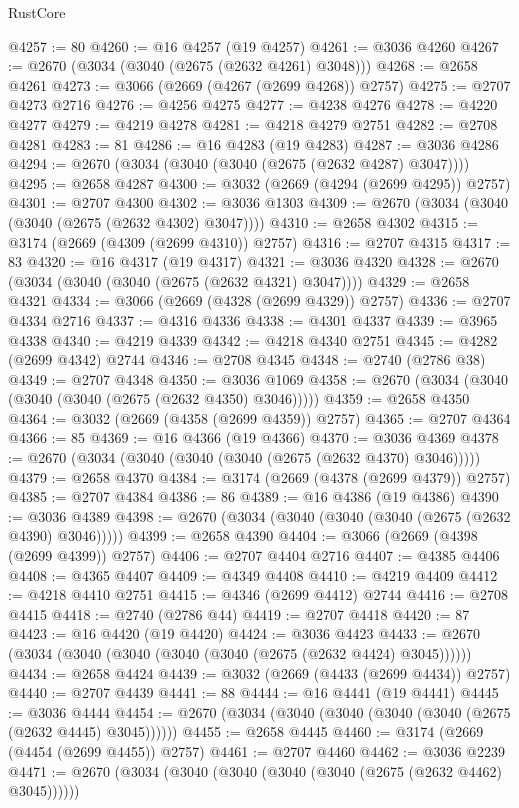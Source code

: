 \begin{lexlean}{RustCore}
\begin{coremodule}
@4257 := 80
@4260 := @16 @4257 (@19 @4257)
@4261 := @3036 @4260
@4267 := @2670 (@3034 (@3040 (@2675 (@2632 @4261) @3048)))
@4268 := @2658 @4261
@4273 := @3066 (@2669 (@4267 (@2699 @4268)) @2757)
@4275 := @2707 @4273 @2716
@4276 := @4256 @4275
@4277 := @4238 @4276
@4278 := @4220 @4277
@4279 := @4219 @4278
@4281 := @4218 @4279 @2751
@4282 := @2708 @4281
@4283 := 81
@4286 := @16 @4283 (@19 @4283)
@4287 := @3036 @4286
@4294 := @2670 (@3034 (@3040 (@3040 (@2675 (@2632 @4287) @3047))))
@4295 := @2658 @4287
@4300 := @3032 (@2669 (@4294 (@2699 @4295)) @2757)
@4301 := @2707 @4300
@4302 := @3036 @1303
@4309 := @2670 (@3034 (@3040 (@3040 (@2675 (@2632 @4302) @3047))))
@4310 := @2658 @4302
@4315 := @3174 (@2669 (@4309 (@2699 @4310)) @2757)
@4316 := @2707 @4315
@4317 := 83
@4320 := @16 @4317 (@19 @4317)
@4321 := @3036 @4320
@4328 := @2670 (@3034 (@3040 (@3040 (@2675 (@2632 @4321) @3047))))
@4329 := @2658 @4321
@4334 := @3066 (@2669 (@4328 (@2699 @4329)) @2757)
@4336 := @2707 @4334 @2716
@4337 := @4316 @4336
@4338 := @4301 @4337
@4339 := @3965 @4338
@4340 := @4219 @4339
@4342 := @4218 @4340 @2751
@4345 := @4282 (@2699 @4342) @2744
@4346 := @2708 @4345
@4348 := @2740 (@2786 @38)
@4349 := @2707 @4348
@4350 := @3036 @1069
@4358 := @2670 (@3034 (@3040 (@3040 (@3040 (@2675 (@2632 @4350) @3046)))))
@4359 := @2658 @4350
@4364 := @3032 (@2669 (@4358 (@2699 @4359)) @2757)
@4365 := @2707 @4364
@4366 := 85
@4369 := @16 @4366 (@19 @4366)
@4370 := @3036 @4369
@4378 := @2670 (@3034 (@3040 (@3040 (@3040 (@2675 (@2632 @4370) @3046)))))
@4379 := @2658 @4370
@4384 := @3174 (@2669 (@4378 (@2699 @4379)) @2757)
@4385 := @2707 @4384
@4386 := 86
@4389 := @16 @4386 (@19 @4386)
@4390 := @3036 @4389
@4398 := @2670 (@3034 (@3040 (@3040 (@3040 (@2675 (@2632 @4390) @3046)))))
@4399 := @2658 @4390
@4404 := @3066 (@2669 (@4398 (@2699 @4399)) @2757)
@4406 := @2707 @4404 @2716
@4407 := @4385 @4406
@4408 := @4365 @4407
@4409 := @4349 @4408
@4410 := @4219 @4409
@4412 := @4218 @4410 @2751
@4415 := @4346 (@2699 @4412) @2744
@4416 := @2708 @4415
@4418 := @2740 (@2786 @44)
@4419 := @2707 @4418
@4420 := 87
@4423 := @16 @4420 (@19 @4420)
@4424 := @3036 @4423
@4433 := @2670 (@3034 (@3040 (@3040 (@3040 (@3040 (@2675 (@2632 @4424) @3045))))))
@4434 := @2658 @4424
@4439 := @3032 (@2669 (@4433 (@2699 @4434)) @2757)
@4440 := @2707 @4439
@4441 := 88
@4444 := @16 @4441 (@19 @4441)
@4445 := @3036 @4444
@4454 := @2670 (@3034 (@3040 (@3040 (@3040 (@3040 (@2675 (@2632 @4445) @3045))))))
@4455 := @2658 @4445
@4460 := @3174 (@2669 (@4454 (@2699 @4455)) @2757)
@4461 := @2707 @4460
@4462 := @3036 @2239
@4471 := @2670 (@3034 (@3040 (@3040 (@3040 (@3040 (@2675 (@2632 @4462) @3045))))))

\end{coremodule}
\end{lexlean}
